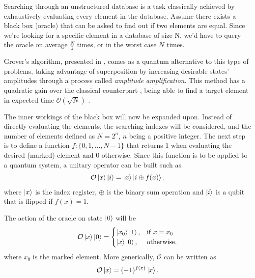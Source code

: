 \documentclass[../../dissertation.tex]{subfiles}
\begin{document}
Searching through an unstructured database is a task classically achieved by
exhaustively evaluating every element in the database. Assume there exists a
black box (oracle) that can be asked to find out if two elements are equal.
Since we're looking for a specific element in a database of size N, we'd have
to query the oracle on average $\frac{N}{2}$ times, or in the worst case $N$
times.\par 

Grover's algorithm, presented in \cite{grover1996}, comes as a
quantum alternative to this type of problems, taking advantage of superposition
by increasing desirable states' amplitudes through a process called
\textit{amplitude amplification}. This method has a quadratic gain over the
classical counterpart \cite{boyer1996}, being able to find a target element in
expected time $\mathcal{O}(\sqrt{N})$ .\par

The inner workings of the black box will now be expanded upon. Instead of
directly evaluating the elements, the searching indexes will be considered,
and the number of elements defined as $N=2^{n}$, $n$ being a positive
integer. The next step is to define a function $f : \{0,1,...,N-1\}$ that
returns $1$ when evaluating the desired (marked) element and $0$ otherwise.
Since this function is to be applied to a quantum system, a unitary operator
can be built such as 
\begin{equation}
	\mathcal{O}\ket{x}\ket{i} = \ket{x}\ket{i\oplus f(x)} .
\end{equation}
where $\ket{x}$ is the index register, $\oplus$ is the binary sum operation and
$\ket{i}$ is a qubit that is flipped if $f(x)=1$.\par 

The action of the oracle on state $\ket{0}$ will be
\begin{equation}
	\mathcal{O}\ket{x}\ket{0} = \begin{cases} \ket{x_0}\ket{1}, & \mbox{if } x = x_0 \\ \ket{x}\ket{0}, & \mbox{otherwise.} \end{cases}
\end{equation}
where $x_0$ is the marked element. More generically, $\mathcal{O}$ can be
written as 
\begin{equation}
	\mathcal{O}\ket{x} = (-1)^{f(x)}\ket{x} .
\end{equation}\par
\end{document}
